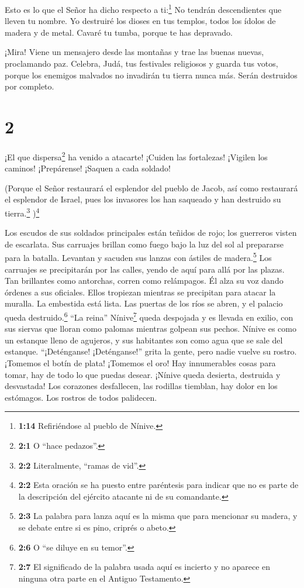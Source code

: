  Esto es lo que el Señor ha dicho respecto a
ti:\footnote{\textbf{1:14} Refiriéndose al pueblo de Nínive.} No tendrán
descendientes que lleven tu nombre. Yo destruiré los dioses en tus
templos, todos los ídolos de madera y de metal. Cavaré tu tumba, porque
te has depravado.

 ¡Mira! Viene un mensajero desde las montañas y trae las
buenas nuevas, proclamando paz. Celebra, Judá, tus festivales religiosos
y guarda tus votos, porque los enemigos malvados no invadirán tu tierra
nunca más. Serán destruidos por completo.

\hypertarget{section-1}{%
\section{2}\label{section-1}}

 ¡El que dispersa\footnote{\textbf{2:1} O ``hace
  pedazos''.} ha venido a atacarte! ¡Cuiden las fortalezas! ¡Vigilen los
caminos! ¡Prepárense! ¡Saquen a cada soldado!

 (Porque el Señor restaurará el esplendor del pueblo de
Jacob, así como restaurará el esplendor de Israel, pues los invasores
los han saqueado y han destruido su tierra.\footnote{\textbf{2:2}
  Literalmente, ``ramas de vid''.} )\footnote{\textbf{2:2} Esta oración
  se ha puesto entre paréntesis para indicar que no es parte de la
  descripción del ejército atacante ni de su comandante.}

 Los escudos de sus soldados principales están teñidos de
rojo; los guerreros visten de escarlata. Sus carruajes brillan como
fuego bajo la luz del sol al prepararse para la batalla. Levantan y
sacuden sus lanzas con ástiles de madera.\footnote{\textbf{2:3} La
  palabra para lanza aquí es la misma que para mencionar su madera, y se
  debate entre si es pino, criprés o abeto.}  Los
carruajes se precipitarán por las calles, yendo de aquí para allá por
las plazas. Tan brillantes como antorchas, corren como relámpagos.
 Él alza su voz dando órdenes a sus oficiales. Ellos
tropiezan mientras se precipitan para atacar la muralla. La embestida
está lista.  Las puertas de los ríos se abren, y el
palacio queda destruido.\footnote{\textbf{2:6} O ``se diluye en su
  temor''.}  ``La reina'' Nínive\footnote{\textbf{2:7} El
  significado de la palabra usada aquí es incierto y no aparece en
  ninguna otra parte en el Antiguo Testamento.} queda despojada y es
llevada en exilio, con sus siervas que lloran como palomas mientras
golpean sus pechos.  Nínive es como un estanque lleno de
agujeros, y sus habitantes son como agua que se sale del estanque.
``¡Deténganse! ¡Deténganse!'' grita la gente, pero nadie vuelve su
rostro.  ¡Tomemos el botín de plata! ¡Tomemos el oro! Hay
innumerables cosas para tomar, hay de todo lo que puedas desear.
 ¡Nínive queda desierta, destruida y desvastada! Los
corazones desfallecen, las rodillas tiemblan, hay dolor en los
estómagos. Los rostros de todos palidecen.

